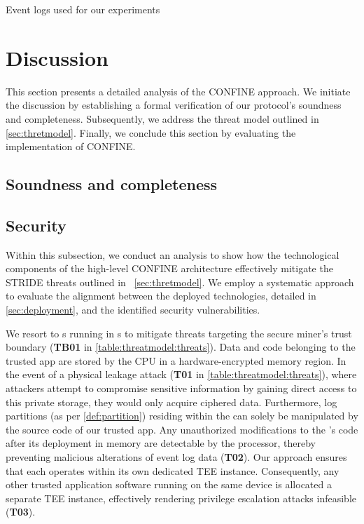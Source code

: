 \begin{table}[t]%
	\caption{Event logs used for our experiments}
	\label{tab:testedlogs}
	\centering
	
\end{table}
\label{sec:discussion:subsec:convergence}
\section{Discussion}
\begin{newj}
This section presents a detailed analysis of the CONFINE approach. We initiate the discussion by establishing a formal verification of our protocol's soundness and completeness. Subsequently, we address the threat model outlined in \cref{sec:thretmodel}. Finally, we conclude this section by evaluating the implementation of CONFINE.
\label{sec:evaluation}
\subsection{Soundness and completeness}
\subsection{Security}
Within this subsection, we conduct an analysis to show how the technological components of the high-level CONFINE architecture effectively mitigate the STRIDE threats outlined in ~\cref{sec:thretmodel}. We employ a systematic approach to evaluate the alignment between the deployed technologies, detailed in \cref{sec:deployment}, and the identified security vulnerabilities. 

We resort to s running in s to mitigate threats targeting the secure miner's trust boundary (\textbf{TB01} in \cref{table:threatmodel:threats}). Data and code belonging to the  trusted app are stored by the CPU in a hardware-encrypted memory region. In the event of a physical leakage attack (\textbf{T01} in \cref{table:threatmodel:threats}), where attackers attempt to compromise sensitive information by gaining direct access to this private storage, they would only acquire ciphered data. Furthermore, log partitions (as per \cref{def:partition}) residing within the  can solely be manipulated by the source code of our  trusted app. Any unauthorized modifications to the 's code after its deployment in memory are detectable by the processor, thereby preventing malicious alterations of event log data (\textbf{T02}). Our approach ensures that each  operates within its own dedicated TEE instance. Consequently, any other trusted application software running on the same device is allocated a separate TEE instance, effectively rendering privilege escalation attacks infeasible (\textbf{T03}).


\end{newj}
